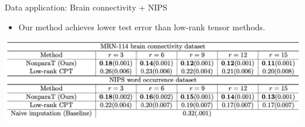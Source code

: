 \documentclass[10pt, mathserif]{beamer} %
\theoremstyle{definition}
\theoremstyle{plain}
\begin{document}
\begin{frame}{Data application: Brain connectivity + NIPS}
\begin{itemize}
\item Our method achieves lower test error than low-rank tensor methods. 
\end{itemize}
      \begin{center}
     \begin{table}
    \includegraphics[width =\textwidth]{Figures/cvtable.pdf}
    \caption{\scriptsize MAE comparison in the brain data and NIPS data based on 5-folded cross-validations. Standard errors are reported in parenthesis.}
    \end{table}
    \end{center}
\end{frame}
\end{document}

